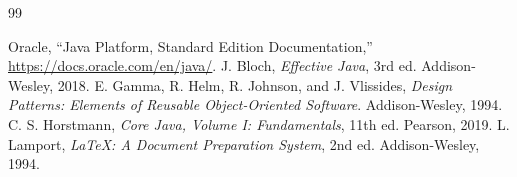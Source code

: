 \documentclass[11pt,a4paper]{report}
\begin{document}
\begin{thebibliography}{99}
Oracle, ``Java Platform, Standard Edition Documentation,'' \url{https://docs.oracle.com/en/java/}.
J. Bloch, \textit{Effective Java}, 3rd ed. Addison-Wesley, 2018.
E. Gamma, R. Helm, R. Johnson, and J. Vlissides, \textit{Design Patterns: Elements of Reusable Object-Oriented Software}. Addison-Wesley, 1994.
C. S. Horstmann, \textit{Core Java, Volume I: Fundamentals}, 11th ed. Pearson, 2019.
L. Lamport, \textit{\LaTeX: A Document Preparation System}, 2nd ed. Addison-Wesley, 1994.
\end{thebibliography}
\end{document}
